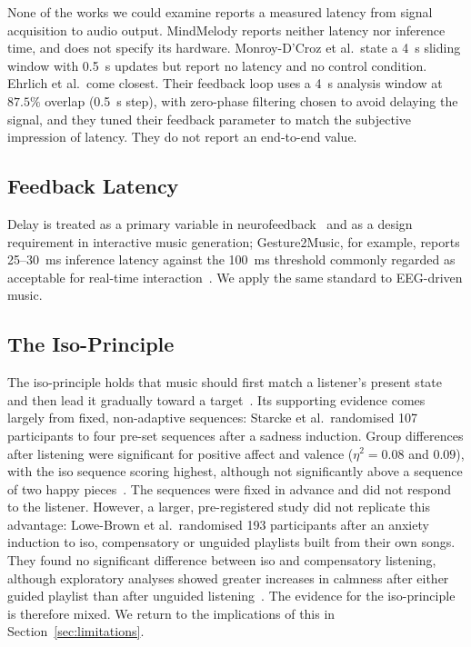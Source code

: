 \documentclass[11pt,a4paper]{article}
\begin{document}
None of the works we could examine reports a measured latency from signal acquisition to
audio output.
MindMelody reports neither latency nor inference time, and does not specify its hardware.
Monroy-D'Croz et al.\ state a 4~s sliding window with 0.5~s updates but report no latency
and no control condition. Ehrlich et al.\ come closest. Their feedback loop uses a 4~s
analysis window at $87.5\%$ overlap (0.5~s step), with zero-phase filtering chosen to avoid
delaying the signal, and they tuned their feedback parameter to match the subjective
impression of latency. They do not report an end-to-end value.

\subsection{Feedback Latency}

Delay is treated as a primary variable in neurofeedback~\cite{belinskaia,asai} and as a
design requirement in interactive music generation; Gesture2Music, for example, reports
25--30~ms inference latency against the 100~ms threshold commonly regarded as acceptable
for real-time interaction~\cite{gesture2music}. We apply the same standard to EEG-driven music.

\subsection{The Iso-Principle}

The iso-principle holds that music should first match a listener's present state and then
lead it gradually toward a target~\cite{altshuler}. Its supporting evidence comes largely
from fixed, non-adaptive sequences: Starcke et al.\ randomised 107 participants to four
pre-set sequences after a sadness induction. Group differences after listening were
significant for positive affect and valence ($\eta^2 = 0.08$ and $0.09$), with the iso
sequence scoring highest, although not significantly above a sequence of two happy
pieces~\cite{starcke}. The sequences were fixed in advance and did not respond to the
listener. However, a larger, pre-registered study did not replicate this advantage:
Lowe-Brown et al.\ randomised 193 participants after an anxiety induction to iso,
compensatory or unguided playlists built from their own songs. They found no significant
difference between iso and compensatory listening, although exploratory analyses showed
greater increases in calmness after either guided playlist than after unguided
listening~\cite{lowebrown}. The evidence for the iso-principle is therefore mixed. We
return to the implications of this in Section~\ref{sec:limitations}.
\end{document}
